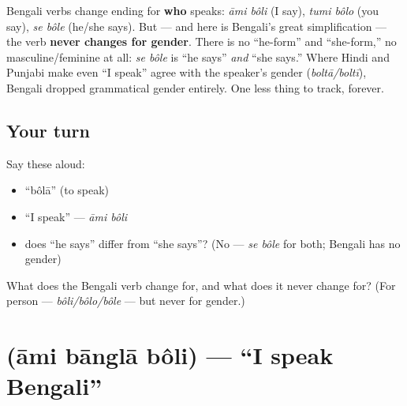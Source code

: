 \begin{grammarlens}[title={Grammar Lens: the verb changes for person — but \emph{never} for gender}]
Bengali verbs change ending for \textbf{who} speaks: \emph{āmi bôli} (I say), \emph{tumi bôlo} (you say), \emph{se bôle} (he/she says). But — and here is Bengali's great simplification — the verb \textbf{never changes for gender}. There is no \textquotedblleft{}he-form\textquotedblright{} and \textquotedblleft{}she-form,\textquotedblright{} no masculine/feminine at all: \emph{se bôle} is \textquotedblleft{}he says\textquotedblright{} \emph{and} \textquotedblleft{}she says.\textquotedblright{} Where Hindi and Punjabi make even \textquotedblleft{}I speak\textquotedblright{} agree with the speaker's gender (\emph{boltā/boltī}), Bengali dropped grammatical gender entirely. One less thing to track, forever.
\end{grammarlens}

\subsection*{Your turn}
Say these aloud:

\begin{itemize}
\raggedright
  \item \textquotedblleft{}bôlā\textquotedblright{} (to speak)
  \item \textquotedblleft{}I speak\textquotedblright{} — \emph{āmi bôli}
  \item does \textquotedblleft{}he says\textquotedblright{} differ from \textquotedblleft{}she says\textquotedblright{}? (No — \emph{se bôle} for both; Bengali has no gender)
\end{itemize}

\begin{tcolorbox}[breakable,colback=teal!4,colframe=teal!35!black,title={Before you move on}]
What does the Bengali verb change for, and what does it never change for? (For person — \emph{bôli/bôlo/bôle} — but never for gender.)
\end{tcolorbox}
\section[\texorpdfstring{\bn{আমি} \bn{বাংলা} \bn{বলি} (āmi bānglā bôli)}{আমি বাংলা বলি (āmi bānglā bôli)}]{   (āmi bānglā bôli) — \textquotedblleft{}I speak Bengali\textquotedblright{}}

\label{lesson:BN-C05-ami-bangla-boli}



